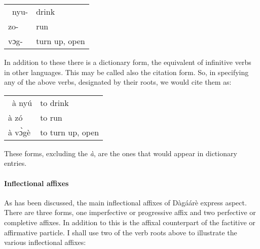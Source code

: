 \ea \begin{tabular}{ll}\  nyu- &drink\\
zo- & run \\
vɔg- & turn up, open\\
\end{tabular}
\z 


In addition to these there is a dictionary form, the equivalent of infinitive verbs in other
languages. This may be called also the citation form. So, in specifying any of the above
verbs, designated by their roots, we would cite them as:

\ea \begin{tabular}{ll}\  à nyú  &to drink\\
à zó & to run \\
à vɔ̀gè &to turn up, open\\
\end{tabular}
\z 


These forms, excluding the \textit{à}, are the ones that would appear in dictionary entries.

\paragraph{Inflectional affixes}
As has been discussed, the main inflectional affixes of Dàgáárè express aspect.
There are three forms, one imperfective or progressive affix and two perfective or completive
affixes. In addition to this is the affixal counterpart of the factitive or affirmative particle. I
shall use two of the verb roots above to illustrate the various inflectional affixes:

\ea {} 
\z\z

